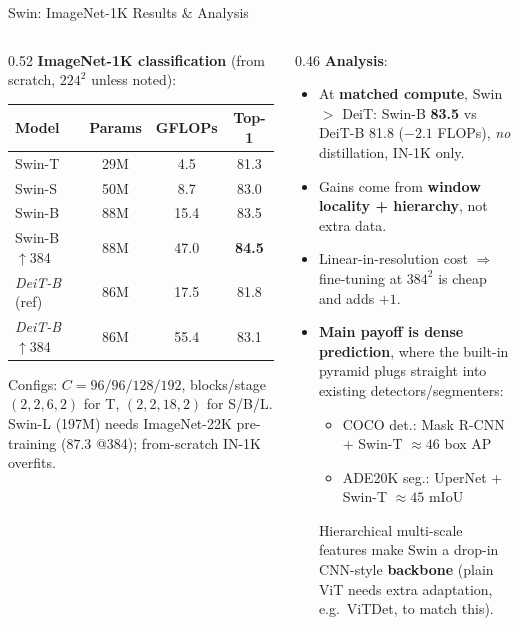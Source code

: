 \begin{frame}{Swin: ImageNet-1K Results \& Analysis}

  \begin{columns}[T]
    \begin{column}{0.52\textwidth}
      \textbf{ImageNet-1K classification} (from scratch, $224^2$ unless noted):
      \begin{center}
        \small
        \begin{tabular}{lccc}
          \toprule
          \textbf{Model} & \textbf{Params} & \textbf{GFLOPs} & \textbf{Top-1} \\
          \midrule
          Swin-T            & 29M & 4.5  & 81.3 \\
          Swin-S            & 50M & 8.7  & 83.0 \\
          Swin-B            & 88M & 15.4 & 83.5 \\
          Swin-B\,$\uparrow$384 & 88M & 47.0 & \textbf{84.5} \\
          \midrule
          \textit{DeiT-B} (ref) & 86M & 17.5 & 81.8 \\
          \textit{DeiT-B}\,$\uparrow$384 & 86M & 55.4 & 83.1 \\
          \bottomrule
        \end{tabular}
      \end{center}
      {\footnotesize Configs: $C{=}96/96/128/192$, blocks/stage $(2,2,6,2)$ for T, $(2,2,18,2)$ for S/B/L. Swin-L (197M) needs ImageNet-22K pre-training ($87.3$ @384); from-scratch IN-1K overfits.}
    \end{column}
    \begin{column}{0.46\textwidth}
      \textbf{Analysis}:
      \begin{itemize}\itemsep2pt
        \item At \textbf{matched compute}, Swin $>$ DeiT: Swin-B \textbf{83.5} vs DeiT-B 81.8 ($-2.1$ FLOPs), \emph{no} distillation, IN-1K only.
        \item Gains come from \textbf{window locality + hierarchy}, not extra data.
        \item Linear-in-resolution cost $\Rightarrow$ fine-tuning at $384^2$ is cheap and adds $+1$.
        \item \textbf{Main payoff is dense prediction}, where the built-in pyramid plugs straight into existing detectors/segmenters:
        \begin{itemize}\footnotesize
          \item COCO det.: Mask R-CNN + Swin-T $\approx 46$ box AP
          \item ADE20K seg.: UperNet + Swin-T $\approx 45$ mIoU
        \end{itemize}
        Hierarchical multi-scale features make Swin a drop-in CNN-style \textbf{backbone} (plain ViT needs extra adaptation, e.g.\ ViTDet, to match this).
      \end{itemize}
    \end{column}
  \end{columns}
\end{frame}

